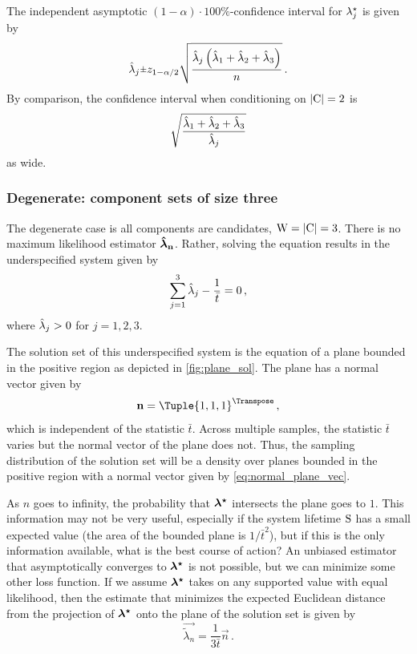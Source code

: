\documentclass[
    11pt,
    extrafontsizes,
    article,
    oldfontcommands,
    final,
    oneside,
    openany,
    hidelinks]{memoir}
\begin{document}
The independent asymptotic $(1-\alpha) \cdot 100 \%$-confidence interval for ${\lambda}^{\star}_j$ is given by
\begin{equation}
    \estimator{\lambda}_j \raisebox{.2ex}{$\scriptstyle\pm$} z_{1 - \alpha/2}
    \sqrt{
        \frac
        {
            \estimator{\lambda}_j \left(\estimator{\lambda}_1 + \estimator{\lambda}_2 + \estimator{\lambda}_3\right)
        }
        {n}
    }\,.
\end{equation}
By comparison, the confidence interval when conditioning on $\lvert\mathrm{C}\rvert = 2$ is
\begin{equation}
    \sqrt{
        \frac
        {
            \hat{\lambda}_1 + \hat{\lambda}_2 + \hat{\lambda}_3
        }
        {
            \hat{\lambda}_j
        }
    }
\end{equation}
as wide.

\subsubsection{Degenerate: component sets of size three}
The degenerate case is all components are candidates, $\mathrm{W} = \lvert\mathrm{C}\rvert = 3$. There is no maximum likelihood estimator $\boldsymbol{\mathbf{\hat{\boldsymbol{\mathbf{\lambda}}}_n}}$. Rather, solving the equation results in the underspecified system given by
\begin{equation}
    \sum_{j=1}^{3} \hat{\lambda}_j - \frac{1}{\bar{t}} = 0\,,
\end{equation}
where $\hat{\lambda}_j > 0$ for $j=1,2,3$.

The solution set of this underspecified system is the equation of a plane bounded in the positive region as depicted in \cref{fig:plane_sol}. The plane has a normal vector given by
\begin{equation}
\label{eq:normal_plane_vec}
    \vec{n} = \Tuple{1,1,1}^\Transpose\,,
\end{equation}
which is independent of the statistic $\bar{t}$. Across multiple samples, the statistic $\bar{t}$ varies but the normal vector of the plane does not. Thus, the sampling distribution of the solution set will be a density over planes bounded in the positive region with a normal vector given by \cref{eq:normal_plane_vec}.

As $n$ goes to infinity, the probability that $\boldsymbol{\mathbf{{\lambda}^{\star}}}$ intersects the plane goes to $1$. This information may not be very useful, especially if the system lifetime $\mathrm{S}$ has a small expected value (the area of the bounded plane is $1/\bar{t}^2$), but if this is the only information available, what is the best course of action? An unbiased estimator that asymptotically converges to $\boldsymbol{\mathbf{{\lambda}^{\star}}}$ is not possible, but we can minimize some other loss function. If we assume $\boldsymbol{\mathbf{{\lambda}^{\star}}}$ takes on any supported value with equal likelihood, then the estimate that minimizes the expected Euclidean distance from the projection of $\boldsymbol{\mathbf{{\lambda}^{\star}}}$ onto the plane of the solution set is given by
\begin{equation}
    \vec{\tilde\lambda_n} = \frac{1}{3 \bar{t}} \vec{n}\,.
\end{equation}
\end{document}
